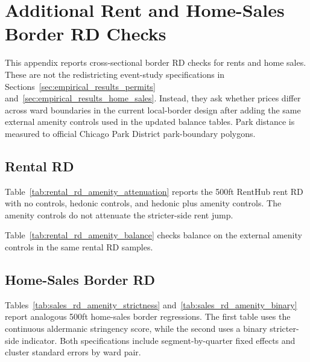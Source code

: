 \section{Additional Rent and Home-Sales Border RD Checks}
\label{sec:appendix_rent_sales_rd}

This appendix reports cross-sectional border RD checks for rents and home sales. These are not the redistricting event-study specifications in Sections~\ref{sec:empirical_results_permits} and~\ref{sec:empirical_results_home_sales}. Instead, they ask whether prices differ across ward boundaries in the current local-border design after adding the same external amenity controls used in the updated balance tables. Park distance is measured to official Chicago Park District park-boundary polygons.

\subsection{Rental RD}

Table~\ref{tab:rental_rd_amenity_attenuation} reports the 500ft RentHub rent RD with no controls, hedonic controls, and hedonic plus amenity controls. The amenity controls do not attenuate the stricter-side rent jump.

\begin{table}[H]
    \caption{RentHub RD: Hedonic and Amenity Controls}
    \label{tab:rental_rd_amenity_attenuation}

    
\end{table}

Table~\ref{tab:rental_rd_amenity_balance} checks balance on the external amenity controls in the same rental RD samples.

\begin{table}[H]
    \caption{RentHub RD: External Amenity Balance}
    \label{tab:rental_rd_amenity_balance}

    
\end{table}

\subsection{Home-Sales Border RD}

Tables~\ref{tab:sales_rd_amenity_strictness} and~\ref{tab:sales_rd_amenity_binary} report analogous 500ft home-sales border regressions. The first table uses the continuous aldermanic stringency score, while the second uses a binary stricter-side indicator. Both specifications include segment-by-quarter fixed effects and cluster standard errors by ward pair.


